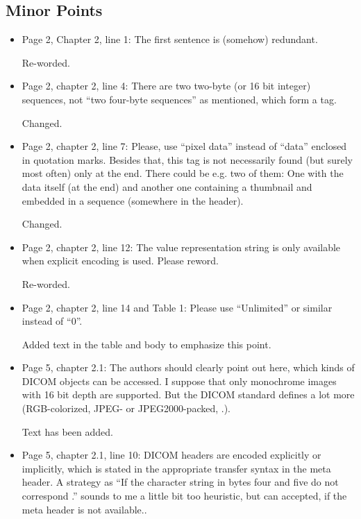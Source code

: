\documentclass[11pt]{article}
\begin{document}
\subsection*{Minor Points}

\begin{itemize}

\item Page 2, Chapter 2, line 1: The first sentence is (somehow)
  redundant.

  Re-worded.

\item Page 2, chapter 2, line 4: There are two two-byte (or 16 bit
  integer) sequences, not ``two four-byte sequences'' as mentioned,
  which form a tag.

  Changed.

\item Page 2, chapter 2, line 7: Please, use ``pixel data'' instead of
  ``data'' enclosed in quotation marks. Besides that, this tag is not
  necessarily found (but surely most often) only at the end. There
  could be e.g. two of them: One with the data itself (at the end) and
  another one containing a thumbnail and embedded in a sequence
  (somewhere in the header).

  Changed.

\item Page 2, chapter 2, line 12: The value representation string is
  only available when explicit encoding is used. Please reword.

  Re-worded.

\item Page 2, chapter 2, line 14 and Table 1: Please use ``Unlimited''
  or similar instead of ``0''.

  Added text in the table and body to emphasize this point.

\item Page 5, chapter 2.1: The authors should clearly point out here,
  which kinds of DICOM objects can be accessed. I suppose that only
  monochrome images with 16 bit depth are supported. But the DICOM
  standard defines a lot more (RGB-colorized, JPEG- or
  JPEG2000-packed, .).

  Text has been added.

\item Page 5, chapter 2.1, line 10: DICOM headers are encoded
  explicitly or implicitly, which is stated in the appropriate
  transfer syntax in the meta header.  A strategy as ``If the
  character string in bytes four and five do not correspond .'' sounds
  to me a little bit too heuristic, but can accepted, if the meta
  header is not available..


\end{itemize}
\end{document}
